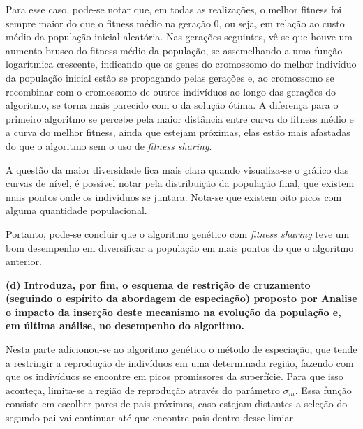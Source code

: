 \documentclass[a4paper, 12pt]{article}
\newcommand{\fitsha}{\textit{fitness sharing}\xspace}
\begin{document}
 Para esse caso, pode-se notar que, em todas as realizações, o melhor fitness foi sempre maior do que o fitness médio na geração 0, ou seja, em relação ao custo médio da população inicial aleatória. Nas gerações seguintes, vê-se que houve um aumento brusco do fitness médio da população, se assemelhando a uma função logarítmica crescente, indicando que os genes do cromossomo do melhor indivíduo da população inicial estão se propagando pelas gerações e, ao cromossomo se recombinar com o cromossomo de outros indivíduos ao longo das gerações do algoritmo, se torna mais parecido com o da solução ótima. A diferença para o primeiro algoritmo se percebe pela maior distância entre curva do fitness médio e a curva do melhor fitness, ainda que estejam próximas, elas estão mais afastadas do que o algoritmo sem o uso de \fitsha.

A questão da maior diversidade fica mais clara quando visualiza-se o gráfico das curvas de nível, é possível notar pela distribuição da população final, que existem mais pontos onde os indivíduos se juntara. Nota-se que existem oito picos com alguma quantidade populacional. 

Portanto, pode-se concluir que o algoritmo genético com \fitsha teve um bom desempenho em diversificar a população em mais pontos do que o algoritmo anterior.

\textbf{(d) Introduza, por fim, o esquema de restrição de cruzamento (seguindo o espírito da abordagem de especiação) proposto por \cite{deb1989genetic} Analise o impacto da inserção deste mecanismo na evolução da população e, em última análise, no desempenho do algoritmo.}

Nesta parte adicionou-se ao algoritmo genético o método de especiação, que tende a restringir a reprodução de indivíduos em uma determinada região, fazendo com que os indivíduos se encontre em picos promissores da superfície. Para que isso aconteça, limita-se a região de reprodução através do parâmetro $\sigma_m$. Essa função consiste em escolher pares de pais próximos, caso estejam distantes a seleção do segundo pai vai continuar até que encontre pais dentro desse limiar
\end{document}
